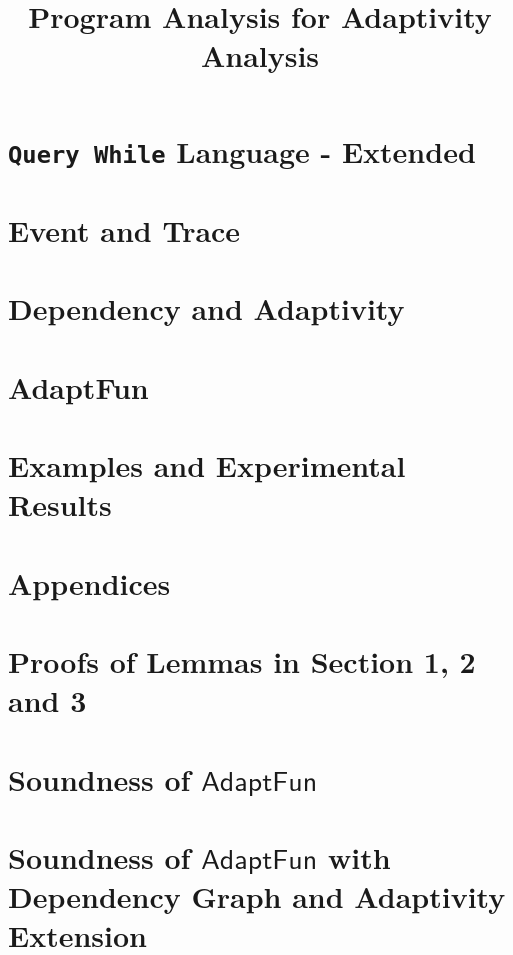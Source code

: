 \documentclass[a4paper,11pt]{article}
\newcommand{\highlight}[1]{\textcolor[rgb]{.0,0.0,1.0}{ #1}}
\newcommand{\THESYSTEM}{\textsf{AdaptFun}}
\begin{document}
\title{Program Analysis for Adaptivity Analysis}

\author{}

\date{}

\maketitle
%
\tableofcontents

% 
\section{\highlight{{\tt Query While} Language - Extended}}
\label{sec:language}

\clearpage
\section{Event and Trace}


\clearpage
\section{\highlight{Dependency and Adaptivity}}


% 
\clearpage
\section{\THESYSTEM}
\label{sec:adpfun}



\clearpage
%
\section{Examples and Experimental Results}


%
\clearpage
\appendix
{}
\section*{Appendices}
\section{Proofs of Lemmas in Section 1, 2 and 3}
\label{apdx:lemma_sec123}

\clearpage
\section{Soundness of $\THESYSTEM$ }
\label{apdx:adapt_soundness}

\clearpage
\section{Soundness of $\THESYSTEM$ \highlight{with Dependency Graph and Adaptivity Extension} }
\label{apdx:adapt_soundness_extend}

\clearpage
\end{document}
